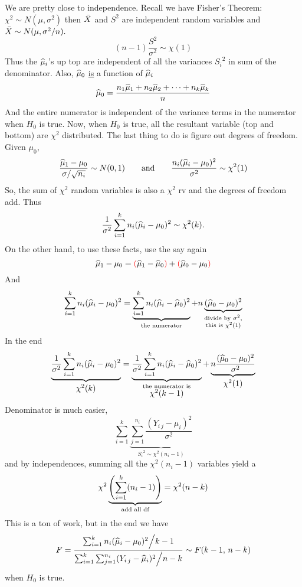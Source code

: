 We are pretty close to independence. Recall we have Fisher's Theorem:
 $\chi^2 \sim N(\mu, \sigma^2)$ then $\bar{X}$ and $S^2$ are independent random variables and $\bar{X} \sim N(\mu, \sigma^2/n).$
 $$(n-1)\frac{S^2}{\sigma^2} \sim \chi(1)$$
Thus the $\widehat{\mu}_i$'s up top are independent of all the variances ${S_i}^2$ in sum of the denominator. Also, $\widehat{\mu}_0$ \underline{is} a function of $\widehat{\mu}_i$
$$\widehat{\mu}_0 = \frac{
    n_1 \widehat{\mu}_1 + n_2 \widehat{\mu}_2 + \cdots + n_k \widehat{\mu}_k
}{n}$$
And the entire numerator is independent of the variance terms in the numerator when $H_0$ is true. Now, when $H_0$ is true, all the resultant variable (top and bottom) are $\chi^2$ distributed. The last thing to do is figure out degrees of freedom. Given $\mu_0$,
$$\frac{\widehat{\mu}_1 - \mu_0}{\sigma / \sqrt{n_i}} \sim N(0,1) \qquad \text{and} \qquad \frac{n_i(\widehat{\mu}_i - \mu_0)^2}{\sigma^2} \sim \chi^2(1)$$
So, the sum of $\chi^2$ random variables is also a $\chi^2$ rv and the degrees of freedom add. Thus
$$\over{\sigma^2} \sum_{i=1}^k n_i (\muh_i - \mu_0)^2 \sim \chi^2(k).$$
On the other hand, to use these facts, use the say  again
$$\widehat{\mu}_1 - \mu_0 = \color{red}{(}\color{black} \widehat{\mu}_1 - \widehat{\mu}_0 \color{red}{)}\color{black} + \color{red}{(}\color{black} \widehat{\mu}_0 - \mu_0 \color{red}{)}\color{black}$$
And
$$\sum_{i=1}^k n_i (\widehat{\mu}_i - \mu_0)^2 = \underbrace{
\sum_{i=1}^k n_i (\widehat{\mu}_i - \widehat{\mu}_0)^2
}_{
    \text{the numerator}
} + n \underbrace{
    (\widehat{\mu}_0 - \mu_0)^2
}_{
    \substack{\text{divide by } \sigma^2, \\ \text{this is } \chi^2(1)}
}$$
In the end
$$\underbrace{
    \over{\sigma^2} \sum_{i=1}^k n_i (\muh_i - \mu_0)^2
}_{\textstyle \chi^2(k)} = \underbrace{
    \over{\sigma^2}  \sum_{i=1}^k n_i (\muh_i - \muh_0)^2
}_{
    \substack{\text{the numerator is} \\ \textstyle \chi^2(k-1)}
} + \underbrace{
    n\frac{ (\muh_0 - \mu_0)^2}{\sigma^2}
}_{\textstyle \chi^2(1)}$$
Denominator is much easier,
$$\sum_{i=1}^k \underbrace{\sum_{j=1}^{n_i} \frac{(Y_{i\,j} - \mu_i)^2}{\sigma^2}}_{\textstyle {S_i}^2 \sim \chi^2(n_i - 1)}$$
and by independences, summing all the $\chi^2(n_i -1)$ variables yield a
$$\chi^2 \underbrace{\pars{\sum_{i=1}^k (n_i - 1)}}_{\text{add all \df}} = \chi^2(n-k)$$
This is a ton of work, but in the end we have
$$F = \frac{
    \sum_{i=1}^k n_i (\widehat{\mu}_i - \mu_0)^2 \Big/ k-1
} {
    \sum_{i=1}^k \sum_{j=1}^{n_i} (Y_{i\,j} - \widehat{\mu}_i)^2 \Big/ n-k
} \sim F(k-1,\, n-k)$$
when $H_0$ is true.

